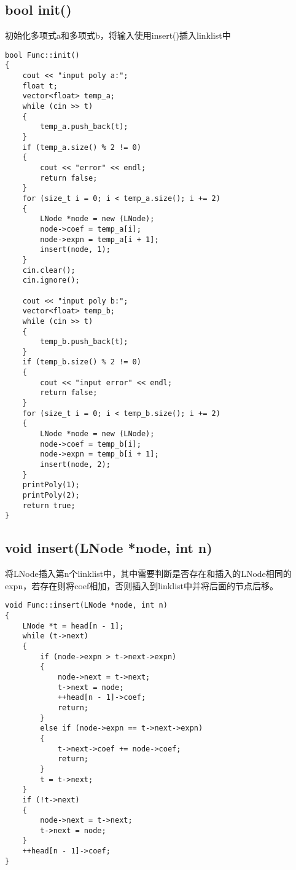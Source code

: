 \documentclass[10pt, a4paper, oneside]{ctexart}
\begin{document}
\subsection{bool init()}
初始化多项式a和多项式b，将输入使用insert()插入linklist中
\begin{lstlisting}
bool Func::init()
{
    cout << "input poly a:";
    float t;
    vector<float> temp_a;
    while (cin >> t)
    {
        temp_a.push_back(t);
    }
    if (temp_a.size() % 2 != 0)
    {
        cout << "error" << endl;
        return false;
    }
    for (size_t i = 0; i < temp_a.size(); i += 2)
    {
        LNode *node = new (LNode);
        node->coef = temp_a[i];
        node->expn = temp_a[i + 1];
        insert(node, 1);
    }
    cin.clear();
    cin.ignore();

    cout << "input poly b:";
    vector<float> temp_b;
    while (cin >> t)
    {
        temp_b.push_back(t);
    }
    if (temp_b.size() % 2 != 0)
    {
        cout << "input error" << endl;
        return false;
    }
    for (size_t i = 0; i < temp_b.size(); i += 2)
    {
        LNode *node = new (LNode);
        node->coef = temp_b[i];
        node->expn = temp_b[i + 1];
        insert(node, 2);
    }
    printPoly(1);
    printPoly(2);
    return true;
}
\end{lstlisting}
\subsection{void insert(LNode *node, int n)}
将LNode插入第n个linklist中，其中需要判断是否存在和插入的LNode相同的expn，若存在则将coef相加，否则插入到linklist中并将后面的节点后移。
\begin{lstlisting}
void Func::insert(LNode *node, int n)
{
    LNode *t = head[n - 1];
    while (t->next)
    {
        if (node->expn > t->next->expn)
        {
            node->next = t->next;
            t->next = node;
            ++head[n - 1]->coef;
            return;
        }
        else if (node->expn == t->next->expn)
        {
            t->next->coef += node->coef;
            return;
        }
        t = t->next;
    }
    if (!t->next)
    {
        node->next = t->next;
        t->next = node;
    }
    ++head[n - 1]->coef;
}
\end{lstlisting}
\end{document}
